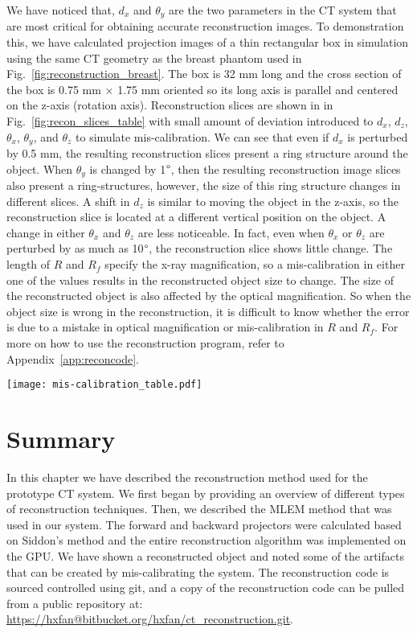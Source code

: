 We have noticed that, $d_x$ and $\theta_y$ are the two parameters in the CT system that are most critical for obtaining accurate reconstruction images.  To demonstration this, we have calculated projection images of a thin rectangular box in simulation using the same CT geometry as the breast phantom used in Fig.~\ref{fig:reconstruction_breast}.  The box is 32 mm long and the cross section of the box is 0.75 mm $\times$ 1.75 mm oriented so its long axis is parallel and centered on the z-axis (rotation axis).  Reconstruction slices are shown in in Fig.~\ref{fig:recon_slices_table} with small amount of deviation introduced to $d_x$, $d_z$, $\theta_x$, $\theta_y$, and $\theta_z$ to simulate mis-calibration.  We can see that even if $d_x$ is perturbed by 0.5 mm, the resulting reconstruction slices present a ring structure around the object.  When $\theta_y$ is changed by 1$\degree$, then the resulting reconstruction image slices also present a ring-structures, however, the size of this ring structure changes in different slices.  A shift in $d_z$ is similar to moving the object in the z-axis, so the reconstruction slice is located at a different vertical position on the object.  A change in either $\theta_x$ and $\theta_z$ are less noticeable.  In fact, even when $\theta_x$ or $\theta_z$ are perturbed by as much as 10$\degree$, the reconstruction slice shows little change.  The length of $R$ and $R_f$ specify the x-ray magnification, so a mis-calibration in either one of the values results in the reconstructed object size to change.  The size of the reconstructed object is also affected by the optical magnification.  So when the object size is wrong in the reconstruction, it is difficult to know whether the error is due to a mistake in optical magnification or mis-calibration in $R$ and $R_f$.  For more on how to use the reconstruction program, refer to Appendix~\ref{app:reconcode}. 

\begin{sidewaysfigure}
\texttt{[image: mis-calibration\_table.pdf]}
\caption{Reconstruction slices of a thin rectangular box when small deviations were presented at various parameters.}
\label{fig:recon_slices_table}
\end{sidewaysfigure}


\section{Summary}
In this chapter we have described the reconstruction method used for the prototype CT system.  We first began by providing an overview of different types of reconstruction techniques.  Then, we described the MLEM method that was used in our system.  The forward and backward projectors were calculated based on Siddon's method and the entire reconstruction algorithm was implemented on the GPU.  We have shown a reconstructed object and noted some of the artifacts that can be created by mis-calibrating the system.  The reconstruction code is sourced controlled using git, and a copy of the reconstruction code can be pulled from a public repository at: \url{https://hxfan@bitbucket.org/hxfan/ct_reconstruction.git}.



